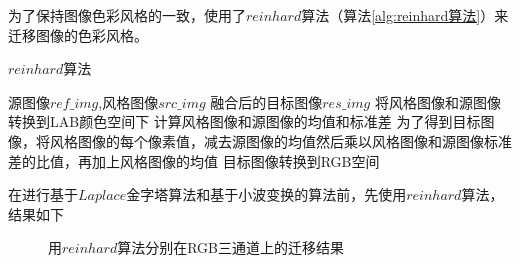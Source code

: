 \documentclass[a4paper, 11pt]{article}
\begin{document}
为了保持图像色彩风格的一致，使用了$reinhard$算法（算法\ref{alg:reinhard算法}）来迁移图像的色彩风格\cite{reinhard}。
\begin{algorithm}[H]
\caption{$reinhard$算法}  
\label{alg:reinhard算法}  
\begin{algorithmic}[1]
    \REQUIRE 源图像$ref\_img$,风格图像$src\_img$
    \ENSURE 融合后的目标图像$res\_img$
    \STATE 将风格图像和源图像转换到LAB颜色空间下
    \STATE 计算风格图像和源图像的均值和标准差
    \STATE 为了得到目标图像，将风格图像的每个像素值，减去源图像的均值然后乘以风格图像和源图像标准差的比值，再加上风格图像的均值
    \STATE 目标图像转换到RGB空间
\end{algorithmic}  
\end{algorithm}

在进行基于$Laplace$金字塔算法和基于小波变换的算法前，先使用$reinhard$算法，结果如下
\begin{figure}[H]
    \centering
    \hspace{0.1 in}
    \hspace{0.1in}
\caption{用$reinhard$算法分别在RGB三通道上的迁移结果}
\label{fig:用$reinhard$算法分别在RGB三通道上的迁移结果} 
\end{figure}
\end{document}
